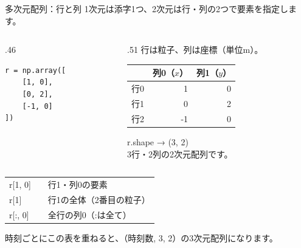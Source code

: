 \documentclass[12pt,aspectratio=43]{beamer}
\newcommand{\code}[1]{{\codefont #1}}
\begin{document}
\begin{frame}[t,fragile]{多次元配列：行と列}
  \setlength{\parskip}{0pt}
  \small 1次元は添字1つ、2次元は行・列の2つで要素を指定します。
  \begin{columns}[T,onlytextwidth]
    \begin{column}{.46\textwidth}
\begin{lstlisting}
r = np.array([
    [1, 0],
    [0, 2],
    [-1, 0]
])
\end{lstlisting}
    \end{column}
    \begin{column}{.51\textwidth}
      \small 行は粒子、列は座標（単位m）。\\[1mm]
      \begingroup
        \setlength{\tabcolsep}{3pt}
        \renewcommand{\arraystretch}{1.05}
        \begin{tabular}{@{}crr@{}}
          & \textcolor{courseblue}{列0（\(x\)）} & \textcolor{courseblue}{列1（\(y\)）}\\
          \hline
          行0 & 1 & 0\\
          行1 & 0 & 2\\
          行2 & -1 & 0
        \end{tabular}\par
      \endgroup
      \code{r.shape} → \code{(3, 2)}\\
      3行・2列の2次元配列です。
    \end{column}
  \end{columns}
  \vspace{1mm}
  \begingroup
    \small
    \setlength{\tabcolsep}{3pt}
    \renewcommand{\arraystretch}{1.1}
    \begin{tabular}{@{}lll@{}}
      \code{r[1, 0]} & \code{0} & 行1・列0の要素\\
      \code{r[1]} & \code{[0 2]} & 行1の全体（2番目の粒子）\\
      \code{r[:, 0]} & \code{[1 0 -1]} & 全行の列0（\code{:}は全て）
    \end{tabular}\par
  \endgroup
  \vspace{1mm}
  {\footnotesize 時刻ごとにこの表を重ねると、（時刻数, 3, 2）の3次元配列になります。}
\end{frame}
\end{document}
